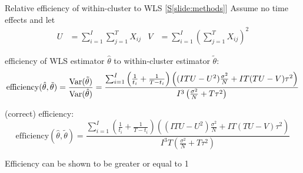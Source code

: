 \documentclass[9pt]{beamer}
\begin{document}
\addtocounter{framenumber}{-1}
\begin{frame}{Relative efficiency of within-cluster to WLS [\hyperlink{slide:methods}{S\ref{slide:methods}}]} \label{apx:efficiency}
Assume no time effects and let
\begin{align*}
U &= \sum_{i=1}^I\sum_{j=1}^TX_{ij} & V &= \sum_{i=1}^I\left(\sum_{j=1}^TX_{ij}\right)^2
\end{align*}
\vspace{0.5em}

\citet{Hussey:2007} efficiency of WLS estimator $\hat{\theta}$ to within-cluster estimator $\tilde{\theta}$:
\[
\mathrm{efficiency}(\hat{\theta},\tilde{\theta}) = \frac{\mathrm{Var}(\tilde{\theta})}{\mathrm{Var}(\hat{\theta})} = \frac{\sum_{i=1}^I\left(\frac{1}{t_i}+\frac{1}{T-t_i}\right)\left((ITU-U^2)\frac{\sigma^2}{N}+IT(TU-V)\tau^2\right)}{I^3\left(\frac{\sigma^2}{N}+T\tau^2\right)}
\]
\vspace{0.5em}

\citet{Liao:2015} (correct) efficiency:
\[
\mathrm{efficiency}(\hat{\theta},\tilde{\theta}) = \frac{\sum_{i=1}^I\left(\frac{1}{t_i}+\frac{1}{T-t_i}\right)\left((ITU-U^2)\frac{\sigma^2}{N}+IT(TU-V)\tau^2\right)}{I^3T\left(\frac{\sigma^2}{N}+T\tau^2\right)}
\]
\vspace{0.5em}

Efficiency can be shown to be greater or equal to 1
\end{frame}
\end{document}
